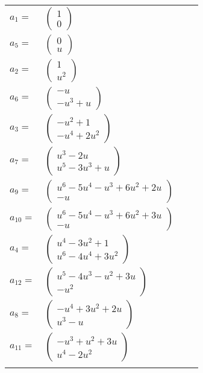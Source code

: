 \documentclass[1p]{elsarticle_modified}
\theoremstyle{definition}
\begin{document}
\begin{tabular}{m{7pt} m{180pt} m{7pt} m{180pt} }
\flushright $a_{1}=$&$\begin{pmatrix}1\\0\end{pmatrix}$ \\
\flushright $a_{5}=$&$\begin{pmatrix}0\\u\end{pmatrix}$ \\
\flushright $a_{2}=$&$\begin{pmatrix}1\\u^2\end{pmatrix}$ \\
\flushright $a_{6}=$&$\begin{pmatrix}- u\\- u^3+u\end{pmatrix}$ \\
\flushright $a_{3}=$&$\begin{pmatrix}- u^2+1\\- u^4+2 u^2\end{pmatrix}$ \\
\flushright $a_{7}=$&$\begin{pmatrix}u^3-2 u\\u^5-3 u^3+u\end{pmatrix}$ \\
\flushright $a_{9}=$&$\begin{pmatrix}u^6-5 u^4- u^3+6 u^2+2 u\\- u\end{pmatrix}$ \\
\flushright $a_{10}=$&$\begin{pmatrix}u^6-5 u^4- u^3+6 u^2+3 u\\- u\end{pmatrix}$ \\
\flushright $a_{4}=$&$\begin{pmatrix}u^4-3 u^2+1\\u^6-4 u^4+3 u^2\end{pmatrix}$ \\
\flushright $a_{12}=$&$\begin{pmatrix}u^5-4 u^3- u^2+3 u\\- u^2\end{pmatrix}$ \\
\flushright $a_{8}=$&$\begin{pmatrix}- u^4+3 u^2+2 u\\u^3- u\end{pmatrix}$ \\
\flushright $a_{11}=$&$\begin{pmatrix}- u^3+u^2+3 u\\u^4-2 u^2\end{pmatrix}$\\&\end{tabular}
\end{document}

